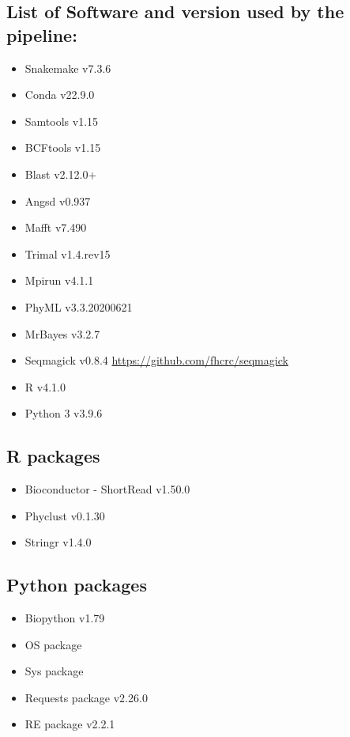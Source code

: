 \documentclass{book}
\begin{document}
\subsection{List of Software and version used by the pipeline:}
\begin{itemize}	
\item Snakemake v7.3.6 \cite{molder2021sustainable}
\item Conda v22.9.0 \cite{anaconda}
\item Samtools v1.15 \cite{li2009sequence}
\item BCFtools v1.15 \cite{li2011statistical}
\item Blast v2.12.0+ \cite{national2008blast}
\item Angsd v0.937 \cite{korneliussen_angsd:_2014}
\item Mafft v7.490 \cite{katoh2013mafft,long2016determination}
\item Trimal v1.4.rev15 \cite{capella2009trimal}
\item Mpirun v4.1.1 \cite{mpi40}
\item PhyML v3.3.20200621 \cite{guindon2010new}
\item MrBayes v3.2.7 \cite{huelsenbeck2001mrbayes}
\item Seqmagick v0.8.4 \url{https://github.com/fhcrc/seqmagick}
\item R v4.1.0 \cite{team2013r}
\item Python 3 v3.9.6 \cite{10.5555/1593511}

\end{itemize}

\subsection{R packages}
\begin{itemize}	
\item Bioconductor - ShortRead v1.50.0 \cite{morgan2009shortread}
\item Phyclust  v0.1.30 \cite{chen2011overlapping}
\item Stringr v1.4.0 \cite{STRINGRR}
\end{itemize}


\subsection{Python packages}

\begin{itemize}	
\item Biopython v1.79 \cite{cock2009biopython}
\item OS package \cite{10.5555/1593511}
\item Sys package \cite{10.5555/1593511}
\item Requests package v2.26.0 \cite{chandra2015python}
\item RE package v2.2.1\cite{van1995python}
\end{itemize}
\end{document}
